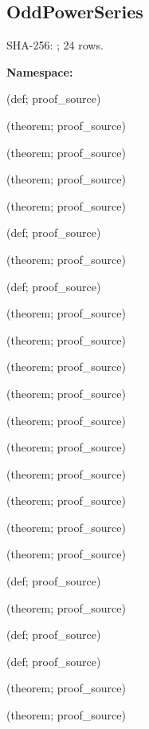\subsection*{OddPowerSeries}
{\footnotesize SHA-256: ; 24 rows.}\par
\begingroup\small
\textbf{Namespace:} \par
\noindent{} {\scriptsize (def; proof\_source)}\par
\noindent{} {\scriptsize (theorem; proof\_source)}\par
\noindent{} {\scriptsize (theorem; proof\_source)}\par
\noindent{} {\scriptsize (theorem; proof\_source)}\par
\noindent{} {\scriptsize (theorem; proof\_source)}\par
\noindent{} {\scriptsize (def; proof\_source)}\par
\noindent{} {\scriptsize (theorem; proof\_source)}\par
\noindent{} {\scriptsize (def; proof\_source)}\par
\noindent{} {\scriptsize (theorem; proof\_source)}\par
\noindent{} {\scriptsize (theorem; proof\_source)}\par
\noindent{} {\scriptsize (theorem; proof\_source)}\par
\noindent{} {\scriptsize (theorem; proof\_source)}\par
\noindent{} {\scriptsize (theorem; proof\_source)}\par
\noindent{} {\scriptsize (theorem; proof\_source)}\par
\noindent{} {\scriptsize (theorem; proof\_source)}\par
\noindent{} {\scriptsize (theorem; proof\_source)}\par
\noindent{} {\scriptsize (theorem; proof\_source)}\par
\noindent{} {\scriptsize (theorem; proof\_source)}\par
\noindent{} {\scriptsize (def; proof\_source)}\par
\noindent{} {\scriptsize (theorem; proof\_source)}\par
\noindent{} {\scriptsize (def; proof\_source)}\par
\noindent{} {\scriptsize (def; proof\_source)}\par
\noindent{} {\scriptsize (theorem; proof\_source)}\par
\noindent{} {\scriptsize (theorem; proof\_source)}\par
\endgroup
